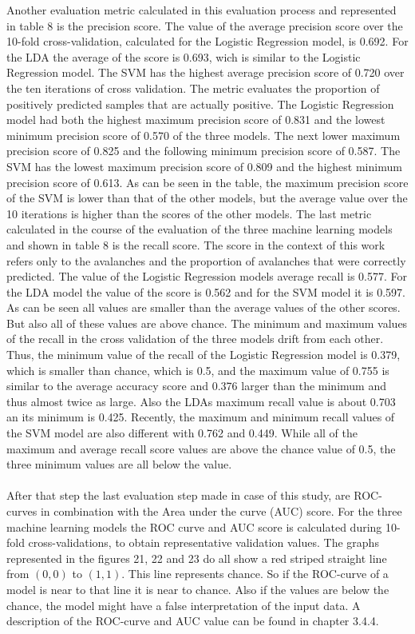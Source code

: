 \documentclass[../masterarbeit.tex]{subfiles}
\begin{document}
Another evaluation metric calculated in this evaluation process and represented in table 8 is the precision score. The value of the average precision score over the 10-fold cross-validation, calculated for the Logistic Regression model, is 0.692. For the LDA the average of the score is 0.693, wich is similar to the Logistic Regression model. The SVM has the highest average precision score of 0.720 over the ten iterations of cross validation. The metric evaluates the proportion of positively predicted samples that are actually positive. The Logistic Regression model had both the highest maximum precision score of 0.831 and the lowest minimum precision score of 0.570 of the three models. The next lower maximum precision score of 0.825 and the following minimum precision score of 0.587. The SVM has the lowest maximum precision score of 0.809 and the highest minimum precision score of 0.613. As can be seen in the table, the maximum precision score of the SVM is lower than that of the other models, but the average value over the 10 iterations is higher than the scores of the other models. The last metric calculated in the course of the evaluation of the three machine learning models and shown in table 8 is the recall score. The score in the context of this work refers only to the avalanches and the proportion of avalanches that were correctly predicted. The value of the Logistic Regression models average recall is 0.577. For the LDA model the value of the score is 0.562 and for the SVM model it is 0.597. As can be seen all values are smaller than the average values of the other scores. But also all of these values are above chance. The minimum and maximum values of the recall in the cross validation of the three models drift from each other. Thus, the minimum value of the recall of the Logistic Regression model is 0.379, which is smaller than chance, which is 0.5, and the maximum value of 0.755 is similar to the average accuracy score and 0.376 larger than the minimum and thus almost twice as large. Also the LDAs maximum recall value is about 0.703 an its minimum is 0.425. Recently, the maximum and minimum recall values of the SVM model are also different with 0.762 and 0.449. While all of the maximum and average recall score values are above the chance value of 0.5, the three minimum values are all below the value. \\~\\

After that step the last evaluation step made in case of this study, are ROC-curves in combination with the Area under the curve (AUC) score. For the three machine learning models the ROC curve and AUC score is calculated during 10-fold cross-validations, to obtain representative validation values. The graphs represented in the figures 21, 22 and 23 do all show a red striped straight line from \((0,0)\) to \((1,1)\). This line represents chance. So if the ROC-curve of a model is near to that line it is near to chance. Also if the values are below the chance, the model might have a false interpretation of the input data. A description of the ROC-curve and AUC value can be found in chapter 3.4.4.
\end{document}
